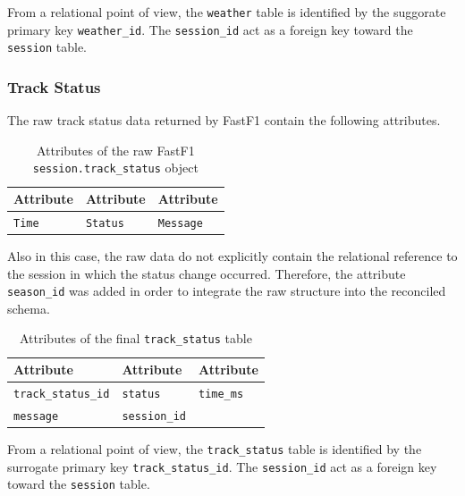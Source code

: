 \documentclass[12pt,a4paper]{article}
\begin{document}
	From a relational point of view, the \texttt{weather} table is identified by the suggorate primary key \texttt{weather\_id}.
	The \texttt{session\_id} act as a foreign key toward the \texttt{session} table.
	
	\subsubsection{Track Status}
	
	The raw track status data returned by FastF1 contain the following attributes.
	
	\begin{table}[H]
		\centering
		\caption{Attributes of the raw FastF1 \texttt{session.track\_status} object}
		\renewcommand{\arraystretch}{1.15}
		\begin{tabularx}{0.95\textwidth}{>{\raggedright\arraybackslash}X >{\raggedright\arraybackslash}X >{\raggedright\arraybackslash}X}
			\toprule
			\textbf{Attribute} & \textbf{Attribute} & \textbf{Attribute} \\
			\midrule
			\texttt{Time} & \texttt{Status} & \texttt{Message} \\
			\bottomrule
		\end{tabularx}
	\end{table}
	
	Also in this case, the raw data do not explicitly contain the relational reference to the session in which the status change occurred.
	Therefore, the attribute \texttt{season\_id} was added in order to integrate the raw structure into the reconciled schema.
	
	\begin{table}[H]
		\centering
		\caption{Attributes of the final \texttt{track\_status} table}
		\renewcommand{\arraystretch}{1.15}
		\begin{tabularx}{0.95\textwidth}{>{\raggedright\arraybackslash}X >{\raggedright\arraybackslash}X >{\raggedright\arraybackslash}X}
			\toprule
			\textbf{Attribute} & \textbf{Attribute} & \textbf{Attribute} \\
			\midrule
			\texttt{track\_status\_id}    & \texttt{status}        & \texttt{time\_ms} \\
			\texttt{message}        &  \texttt{session\_id} &  \\
			\bottomrule
		\end{tabularx}
	\end{table}
	
	From a relational point of view, the \texttt{track\_status} table is identified by the surrogate primary key \texttt{track\_status\_id}.
	The \texttt{session\_id} act as a foreign key toward the \texttt{session} table.
\end{document}
